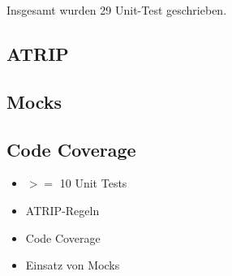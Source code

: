 Insgesamt wurden 29 Unit-Test geschrieben.
\subsection{ATRIP}
\subsection{Mocks}
\subsection{Code Coverage}
\begin{itemize}
	\item $>=$ 10 Unit Tests
	\item ATRIP-Regeln
	\item Code Coverage
	\item Einsatz von Mocks
\end{itemize}

